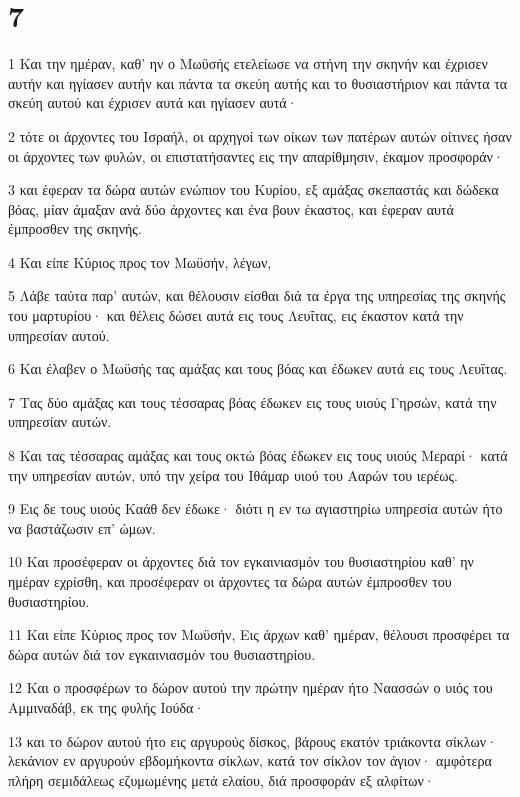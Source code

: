 \chapter{7}

\par 1 Και την ημέραν, καθ' ην ο Μωϋσής ετελείωσε να στήνη την σκηνήν και έχρισεν αυτήν και ηγίασεν αυτήν και πάντα τα σκεύη αυτής και το θυσιαστήριον και πάντα τα σκεύη αυτού και έχρισεν αυτά και ηγίασεν αυτά·
\par 2 τότε οι άρχοντες του Ισραήλ, οι αρχηγοί των οίκων των πατέρων αυτών οίτινες ήσαν οι άρχοντες των φυλών, οι επιστατήσαντες εις την απαρίθμησιν, έκαμον προσφοράν·
\par 3 και έφεραν τα δώρα αυτών ενώπιον του Κυρίου, εξ αμάξας σκεπαστάς και δώδεκα βόας, μίαν άμαξαν ανά δύο άρχοντες και ένα βουν έκαστος, και έφεραν αυτά έμπροσθεν της σκηνής.
\par 4 Και είπε Κύριος προς τον Μωϋσήν, λέγων,
\par 5 Λάβε ταύτα παρ' αυτών, και θέλουσιν είσθαι διά τα έργα της υπηρεσίας της σκηνής του μαρτυρίου· και θέλεις δώσει αυτά εις τους Λευΐτας, εις έκαστον κατά την υπηρεσίαν αυτού.
\par 6 Και έλαβεν ο Μωϋσής τας αμάξας και τους βόας και έδωκεν αυτά εις τους Λευΐτας.
\par 7 Τας δύο αμάξας και τους τέσσαρας βόας έδωκεν εις τους υιούς Γηρσών, κατά την υπηρεσίαν αυτών.
\par 8 Και τας τέσσαρας αμάξας και τους οκτώ βόας έδωκεν εις τους υιούς Μεραρί· κατά την υπηρεσίαν αυτών, υπό την χείρα του Ιθάμαρ υιού του Ααρών του ιερέως.
\par 9 Εις δε τους υιούς Καάθ δεν έδωκε· διότι η εν τω αγιαστηρίω υπηρεσία αυτών ήτο να βαστάζωσιν επ' ώμων.
\par 10 Και προσέφεραν οι άρχοντες διά τον εγκαινιασμόν του θυσιαστηρίου καθ' ην ημέραν εχρίσθη, και προσέφεραν οι άρχοντες τα δώρα αυτών έμπροσθεν του θυσιαστηρίου.
\par 11 Και είπε Κύριος προς τον Μωϋσήν, Εις άρχων καθ' ημέραν, θέλουσι προσφέρει τα δώρα αυτών διά τον εγκαινιασμόν του θυσιαστηρίου.
\par 12 Και ο προσφέρων το δώρον αυτού την πρώτην ημέραν ήτο Ναασσών ο υιός του Αμμιναδάβ, εκ της φυλής Ιούδα·
\par 13 και το δώρον αυτού ήτο εις αργυρούς δίσκος, βάρους εκατόν τριάκοντα σίκλων· λεκάνιον εν αργυρούν εβδομήκοντα σίκλων, κατά τον σίκλον τον άγιον· αμφότερα πλήρη σεμιδάλεως εζυμωμένης μετά ελαίου, διά προσφοράν εξ αλφίτων·
